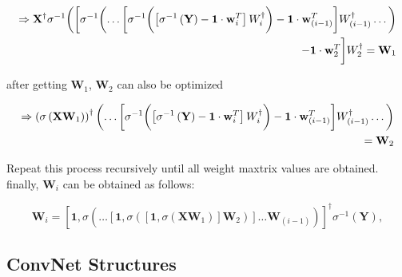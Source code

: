 \documentclass[runningheads]{llncs}
\begin{document}
\begin{equation}
    \begin{aligned}
        \Rightarrow
        \mathbf{X}^{\dagger}\sigma^{-1}\biggl(
        \biggl[\sigma^{-1}\biggl(
        \dots
        \biggl[\sigma^{-1}\biggl(
            \left[\sigma^{-1}\left(\mathbf{Y}\right)-\mathbf{1}\cdot\mathbf{w}_{i}^{T}\right]\mathnormal{W}_{i}^\dagger
        \biggr)
        - \mathbf{1}\cdot\mathbf{w}_{(i-1)}^{T}\biggr]\mathnormal{W}_{(i-1)}^{\dagger}
        \dots\biggr)\\
        - \mathbf{1}\cdot\mathbf{w}_{2}^{T}\biggr]\mathnormal{W}_{2}^{\dagger}
        = \mathbf{W}_{1}
    \end{aligned}
\end{equation}

after getting $\mathbf{W}_{1}$, $\mathbf{W}_{2}$ can also be optimized

\begin{equation}
    \begin{aligned}
        \Rightarrow
        \left(\sigma\left(\mathbf{X}\mathbf{W}_{1}\right)\right)^{\dagger}
        \biggl(\dots
        \biggl[\sigma^{-1}\biggl(
            \left[\sigma^{-1}\left(\mathbf{Y}\right)-\mathbf{1}\cdot\mathbf{w}_{i}^{T}\right]\mathnormal{W}_{i}^\dagger
        \biggr)
        - \mathbf{1}\cdot\mathbf{w}_{(i-1)}^{T}\biggr]\mathnormal{W}_{(i-1)}^{\dagger}
        \dots\biggr)\\
        = \mathbf{W}_{2}
    \end{aligned}
\end{equation}

Repeat this process recursively until all weight maxtrix values are obtained.
finally, $\mathbf{W}_{i}$ can be obtained as follows:

\begin{equation}
    \mathbf{W}_{i} = \left[\mathbf{1},\sigma\left(\dots\left[\mathbf{1},\sigma\left(\left[\mathbf{1},\sigma\left(\mathbf{X}\mathbf{W}_{1}\right)\right]\mathbf{W}_{2}\right)\right]\dots\mathbf{W}_{(i-1)}\right)\right]^{\dagger}\sigma^{-1}\left(\mathbf{Y}\right),
\end{equation}


\subsection{ConvNet Structures}
\end{document}
